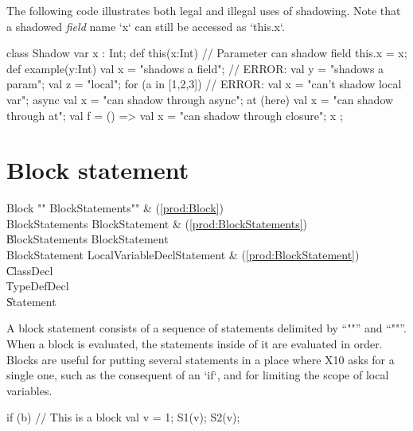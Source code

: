 \begin{ex}
The following code illustrates both legal and illegal uses of shadowing.
Note that a shadowed {\em field} name \xcd`x` can still be accessed 
as \xcd`this.x`. 
\begin{xten}
class Shadow{
  var x : Int; 
  def this(x:Int) { 
     // Parameter can shadow field
     this.x = x; 
  }
  def example(y:Int) {
     val x = "shadows a field";
     // ERROR: val y = "shadows a param";
     val z = "local";
     for (a in [1,2,3]) {
        // ERROR: val x = "can't shadow local var";
     }
     async {
        val x = "can shadow through async";
     }        
     at (here) {
        val x = "can shadow through at";
     }        
     val f = () => { 
       val x = "can shadow through closure";
       x
     };
  }
}
\end{xten}
%


\end{ex}

\section{Block statement}
\label{Blocks}

\begin{bbgrammar}
               Block \: \xcd"{" BlockStatements\opt \xcd"}" & (\ref{prod:Block}) \\
     BlockStatements \: BlockStatement & (\ref{prod:BlockStatements}) \\
                    \| BlockStatements BlockStatement \\
      BlockStatement \: LocalVariableDeclStatement & (\ref{prod:BlockStatement}) \\
                    \| ClassDecl \\
                    \| TypeDefDecl \\
                    \| Statement \\
\end{bbgrammar}


A block statement consists of a sequence of statements delimited by
``\xcd"{"'' and ``\xcd"}"''. When a block is evaluated, the statements inside
of it are evaluated in order.  Blocks are useful for putting several
statements in a place where X10 asks for a single one, such as the consequent
of an \xcd`if`, and for limiting the scope of local variables.
\begin{xten}
if (b) {
  // This is a block
  val v = 1;
  S1(v); 
  S2(v);
}
\end{xten}



